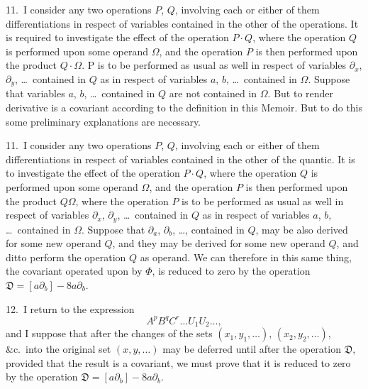 \documentclass[11pt,a4paper]{article}
\begin{document}
\medskip

11.\ I consider any two operations $P$, $Q$, involving each or either of them differentiations in respect of variables contained in the other of the operations. It is required to investigate the effect of the operation $P\cdot Q$, where the operation $Q$ is performed upon some operand $\Omega$, and the operation $P$ is then performed upon the product $Q\cdot \Omega$. P is to be performed as usual as well in respect of variables $\partial_x$, $\partial_y$, \ldots\ contained in $Q$ as in respect of variables $a$, $b$, \ldots\ contained in $\Omega$. Suppose that variables $a$, $b$, \ldots\ contained in $Q$ are not contained in $\Omega$. But to render derivative is a covariant according to the definition in this Memoir. But to do this some preliminary explanations are necessary.

\medskip

11.\ I consider any two operations $P$, $Q$, involving each or either of them differentiations in respect of variables contained in the other of the quantic. It is to investigate the effect of the operation $P\cdot Q$, where the operation $Q$ is performed upon some operand $\Omega$, and the operation $P$ is then performed upon the product $Q\Omega$, where the operation $P$ is to be performed as usual as well in respect of variables $\partial_x$, $\partial_y$, \ldots\ contained in $Q$ as in respect of variables $a$, $b$, \ldots\ contained in $\Omega$. Suppose that $\partial_a$, $\partial_b$, \ldots, contained in $Q$, may be also derived for some new operand $Q$, and they may be derived for some new operand $Q$, and ditto perform the operation $Q$ as operand. We can therefore in this same thing, the covariant operated upon by $\Phi$, is reduced to zero by the operation $\mathfrak{D} = [a\partial_b] - 8a\partial_b$.

\medskip

12.\ I return to the expression
\[
A^p B^q C^r \ldots U_1 U_2 \ldots,
\]
and I suppose that after the changes of the sets $(x_1, y_1, \ldots)$, $(x_2, y_2, \ldots)$, \&c.\ into the original set $(x, y, \ldots)$ may be deferred until after the operation $\mathfrak{D}$, provided that the result is a covariant, we must prove that it is reduced to zero by the operation $\mathfrak{D} = [a\partial_b] - 8a\partial_b$.

\medskip
\end{document}
